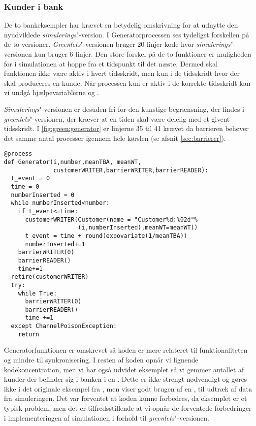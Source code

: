 \subsubsection{Kunder i bank}
De to bankeksempler har krævet en betydelig omskrivning for at udnytte den nyudviklede \emph{simulerings}"-version. I Generatorprocessen ses tydeligst forskellen på de to versioner. \emph{Greenlets}"-versionen bruger 20 linjer kode hvor \emph{simulerings}"-versionen kun bruger 6 linjer. Den store forskel på de to funktioner er muligheden for i simulationen  at hoppe fra et tidspunkt til det næste. Dermed skal funktionen ikke være aktiv i hvert tidsskridt, men kun i de tidsskridt hvor der skal produceres en kunde. Når processen kun er aktiv i de korrekte tidsskridt kan vi undgå hjælpevariablerne  og . 

\emph{Simulerings}"-versionen er desuden fri for den kunstige begrænsning, der findes i \emph{greenlets}"-versionen, der kræver at en tiden skal være delelig med et givent tidsskridt. I \cref{fig:green:generator} er linjerne 35 til 41 krævet da barrieren behøver det samme antal processer igennem hele kørslen (se afsnit \cref{sec:barrierer}). 

\begin{lstlisting}[firstnumber=21, label=fig:green:generator, caption=Generatorprocessen for Greenlets versionen]
@process
def Generator(i,number,meanTBA, meanWT,
              customerWRITER,barrierWRITER,barrierREADER):
  t_event = 0
  time = 0
  numberInserted = 0
  while numberInserted<number:
    if t_event<=time:
      customerWRITER(Customer(name = "Customer%d:%02d"%
                     (i,numberInserted),meanWT=meanWT))
      t_event = time + round(expovariate(1/meanTBA))
      numberInserted+=1
    barrierWRITER(0)
    barrierREADER()
    time+=1
  retire(customerWRITER)
  try:
    while True:
      barrierWRITER(0)
      barrierREADER()
      time +=1
  except ChannelPoisonException: 
    return
\end{lstlisting}

Generatorfunktionen er omskrevet så koden er mere relateret til funktionaliteten og mindre til synkronisering.  I resten af koden opnår vi lignende kodekoncentration, men vi har også udvidet eksemplet så vi gemmer antallet af kunder der befinder sig i banken i en . Dette er ikke strengt nødvendigt og gøres ikke i det originale eksempel fra \simpy, men viser godt brugen af en , til udtræk af data fra simuleringen. Det var  forventet at koden kunne forbedres, da eksemplet er et typisk \des problem, men det er tilfredsstillende at vi opnår de forventede forbedringer i implementeringen af simulationen i forhold til \emph{greenlets}"-versionen.


